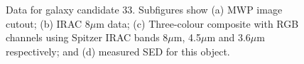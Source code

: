\documentclass[times,usenatbib]{mn2e}
\begin{document}
\begin{figure}
\begin{center}
\caption{Data for galaxy candidate 33. Subfigures show (a) MWP image cutout; (b) IRAC 8$\mu$m data; (c) Three-colour composite with RGB channels using Spitzer IRAC bands 8$\mu$m, 4.5$\mu$m and 3.6$\mu$m respectively; and (d) measured SED for this object.}
\label{gal33}
\end{center}
\end{figure} 
\end{document}
